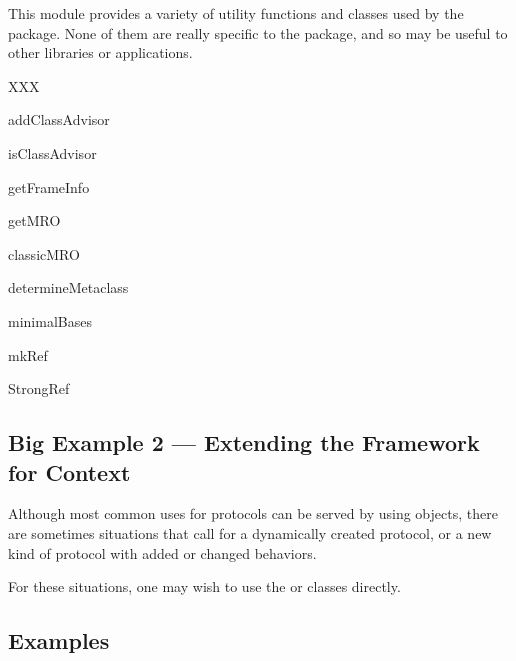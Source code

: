 \begin{verbatim%
}
\begin{verbatim%
}
\begin{verbatim%
}
\begin{verbatim%
}
\begin{verbatim%
}
\begin{verbatim%
}
This module provides a variety of utility functions and classes used by the
 package.  None of them are really specific to the package,
and so may be useful to other libraries or applications.

XXX

addClassAdvisor

isClassAdvisor

getFrameInfo

getMRO

classicMRO

determineMetaclass

minimalBases

mkRef

StrongRef















\subsection{Big Example 2 --- Extending the Framework for Context\label{protocols-context}}

Although most common uses for protocols can be served by using 
objects, there are sometimes situations that call for a dynamically created
protocol, or a new kind of protocol with added or changed behaviors.

For these situations, one may wish to use the  or
 classes directly.

































\subsection{Examples}

\end{verbatim%
}
\end{verbatim%
}
\end{verbatim%
}
\end{verbatim%
}
\end{verbatim%
}
\end{verbatim%
}

